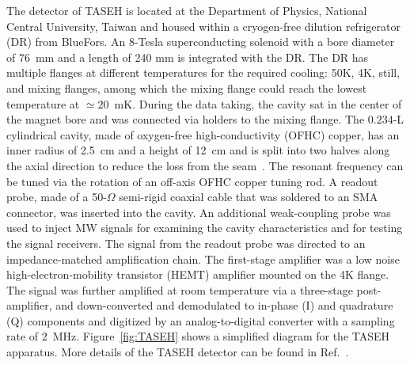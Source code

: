 \documentclass[%
 reprint,prl, %
superscriptaddress,
nobibnotes,
 amsmath,amssymb,
 aps,
]{revtex4-2}
\begin{document}
The detector of TASEH is located at the Department of Physics, National 
Central University, Taiwan and housed within a cryogen-free 
dilution refrigerator (DR) from BlueFors. An 8-Tesla 
superconducting solenoid with a 
bore diameter of 76~mm and a length of 240 mm is integrated with the DR.  
The DR has multiple flanges at different temperatures for 
the required cooling: 50K, 4K, still, 
and mixing flanges, among which the mixing flange could reach the lowest 
temperature at $\simeq20$~mK. 
%
During the data taking, the cavity sat in the center of the magnet bore 
and was connected via holders to the mixing flange. 
The $0.234$-L cylindrical cavity, 
made of oxygen-free high-conductivity (OFHC) copper, 
has an inner radius of 2.5~cm and a height of 12~cm and 
 is split into two halves along the axial direction to reduce the loss from 
the seam~\cite{CAPPCavity}. 
The resonant frequency can be tuned via the rotation of an off-axis OFHC 
copper tuning rod. 
%
A readout probe, made of a 50-$\Omega$ semi-rigid coaxial cable that was 
soldered to an SMA connector, was inserted into the cavity.  
An additional weak-coupling probe was used to inject MW signals for examining 
the cavity 
characteristics and for testing the signal receivers.  
The signal from the readout probe was directed to an 
impedance-matched amplification chain. The first-stage amplifier was 
a low noise high-electron-mobility transistor (HEMT) amplifier 
mounted on the 4K flange. %
The signal was further amplified at room temperature via a 
three-stage post-amplifier, and down-converted 
and demodulated to in-phase (I) and quadrature (Q) components and digitized 
by an analog-to-digital converter with a sampling rate of 2~MHz. 
Figure~\ref{fig:TASEH} shows a simplified diagram for the TASEH apparatus. 
More details of the TASEH detector can be found 
in Ref.~\cite{TASEHInstrumentation}. 
\end{document}
